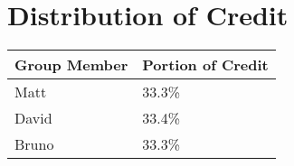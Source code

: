 \section{Distribution of Credit}
\begin{center}
   \begin{tabular}{ l l } 
      \toprule
      \textbf{Group Member}  & \textbf{Portion of Credit} \\
      \midrule
	  Matt & 33.3\% \\
      David & 33.4\% \\
	  Bruno & 33.3\% \\
      \bottomrule
   \end{tabular}
\end{center}
